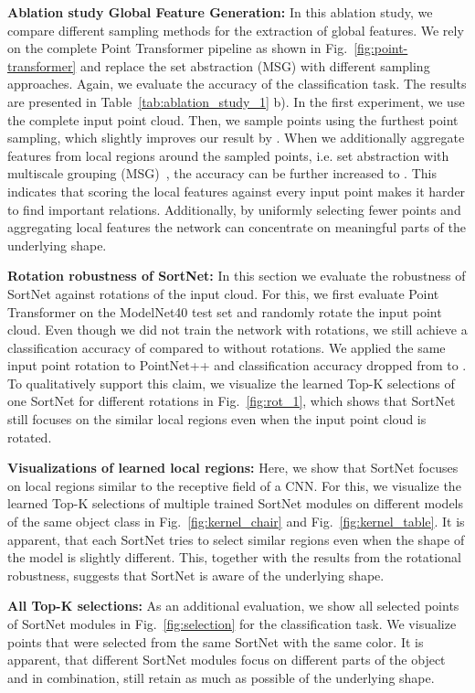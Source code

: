 \documentclass{ieeeaccess}
\begin{document}
\textbf{Ablation study Global Feature Generation:}
In this ablation study, we compare different sampling methods for the extraction of global features. We rely on the complete Point Transformer pipeline as shown in Fig.~\ref{fig:point-transformer} and replace the set abstraction (MSG) with different sampling approaches.
Again, we evaluate the accuracy of the classification task. The results are presented in Table~\ref{tab:ablation_study_1} b). In the first experiment, we use the complete input point cloud. Then, we sample  points using the furthest point sampling, which slightly improves our result by . When we additionally aggregate features from local regions around the sampled points, i.e. set abstraction with multiscale grouping (MSG)~\cite{qi2017pointnet++}, the accuracy can be further increased to . 
This indicates that scoring the local features against every input point makes it harder to find important relations. Additionally, by uniformly selecting fewer points and aggregating local features the network can concentrate on meaningful parts of the underlying shape.



\textbf{Rotation robustness of SortNet:}
In this section we evaluate the robustness of SortNet against rotations of the input cloud. For this, we first evaluate Point Transformer on the ModelNet40 test set and randomly rotate the input point cloud. Even though we did not train the network with rotations, we still achieve a classification accuracy of  compared to  without rotations. We applied the same input point rotation to PointNet++ and classification accuracy dropped from  to . To qualitatively support this claim, we visualize the learned Top-K selections of one SortNet for different rotations in Fig.~\ref{fig:rot_1}, which shows that SortNet still focuses on the similar local regions even when the input point cloud is rotated.

\textbf{Visualizations of learned local regions:} Here, we show that SortNet focuses on local regions similar to the receptive field of a CNN. For this, we visualize the learned Top-K selections of multiple trained SortNet modules on different models of the same object class in Fig.~\ref{fig:kernel_chair} and Fig.~\ref{fig:kernel_table}. It is apparent, that each SortNet tries to select similar regions even when the shape of the model is slightly different. This, together with the results from the rotational robustness, suggests that SortNet is aware of the underlying shape.

\textbf{All Top-K selections:} 
As an additional evaluation, we show all selected points of  SortNet modules in Fig.~\ref{fig:selection} for the classification task. We visualize points that were selected from the same SortNet with the same color. It is apparent, that different SortNet modules focus on different parts of the object and in combination, still retain as much as possible of the underlying shape. 
\end{document}

